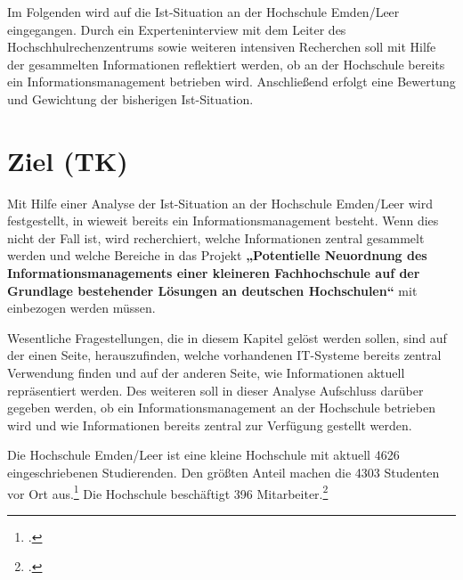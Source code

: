 Im Folgenden wird auf die Ist-Situation an der Hochschule Emden/Leer eingegangen. Durch ein 
Experteninterview mit dem Leiter des Hochschhulrechenzentrums sowie weiteren intensiven Recherchen soll 
mit Hilfe der gesammelten Informationen reflektiert werden, ob an der Hochschule bereits ein 
Informationsmanagement betrieben wird. Anschließend erfolgt eine Bewertung und Gewichtung der 
bisherigen Ist-Situation.

\section{Ziel (TK)}
Mit Hilfe einer Analyse der Ist-Situation an der Hochschule Emden/Leer wird festgestellt, in wieweit bereits 
ein Informationsmanagement besteht. Wenn dies nicht der Fall ist, wird recherchiert, welche Informationen 
zentral gesammelt werden und welche Bereiche in das Projekt \textbf{„Potentielle Neuordnung des 
	Informationsmanagements einer kleineren Fachhochschule auf der Grundlage bestehender Lösungen an 
	deutschen Hochschulen“} mit einbezogen werden müssen.

Wesentliche Fragestellungen, die in diesem Kapitel gelöst werden sollen, sind auf der einen Seite, 
herauszufinden, welche vorhandenen IT-Systeme bereits zentral Verwendung finden und auf der anderen 
Seite, wie Informationen aktuell repräsentiert werden. Des weiteren soll in dieser Analyse Aufschluss darüber 
gegeben werden, ob ein Informationsmanagement an der Hochschule betrieben wird und wie Informationen 
bereits zentral zur Verfügung gestellt werden.

Die Hochschule Emden/Leer ist eine kleine Hochschule mit aktuell 4626 eingeschriebenen Studierenden. Den 
größten Anteil machen die 4303 Studenten vor Ort 
aus.\footcite{hsel_zeitreihe_2014} Die Hochschule beschäftigt 396 
Mitarbeiter.\footcite{hsel_zdf_2015}